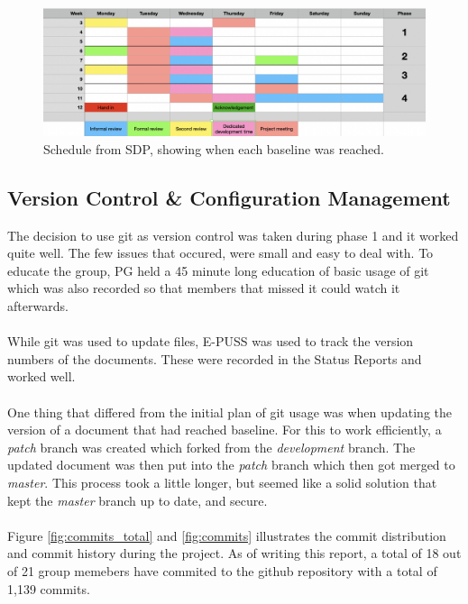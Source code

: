 \documentclass{article}
\begin{document}
        \begin{figure}[!htb]
            \centering
              \includegraphics[width=\linewidth]{images/schedule_after.png}
              \caption{Schedule from SDP, showing when each baseline was reached.}\label{fig:schedule}
            \endminipage\hfill
        \end{figure}
      
      \subsection{Version Control \& Configuration Management \label{cm}}
        The decision to use git as version control was taken during phase 1
        and it worked quite well. The few issues that occured, were small and easy to deal with.
        To educate the group, PG held a 45 minute long education of basic usage of git which was also
        recorded so that members that missed it could watch it afterwards.
        \\ \\
        While git was used to update files, E-PUSS was used to track the version numbers
        of the documents. These were recorded in the Status Reports and worked well.
        \\ \\
        One thing that differed from the initial plan of git usage was when updating
        the version of a document that had reached baseline. For this to work efficiently,
        a \emph{patch} branch was created which forked from the \emph{development} branch.
        The updated document was then put into the \emph{patch} branch which then got merged %
        to \emph{master}. This process took a little longer, but seemed like a solid solution that kept the \emph{master} branch up to date, and secure.
        \\ \\
        Figure \ref{fig:commits_total} and \ref{fig:commits} illustrates the commit distribution
        and commit history during the project. As of writing this report, a total of 18 out of 21 group memebers have commited to the github repository with a total of 1,139 commits.
        
\end{document}
